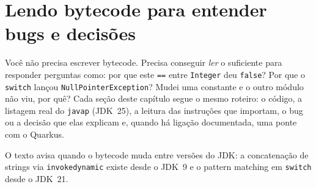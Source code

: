 \chapter{Lendo bytecode para entender bugs e decisões}
\label{cap:lendo-bytecode}

\proximasaulas

Você não precisa escrever bytecode. Precisa conseguir \emph{ler} o
suficiente para responder perguntas como: por que este \texttt{==} entre
\texttt{Integer} deu \texttt{false}? Por que o \texttt{switch} lançou
\texttt{NullPointerException}? Mudei uma constante e o outro módulo não
viu, por quê? Cada seção deste capítulo segue o mesmo roteiro: o código,
a listagem real do \texttt{javap} (JDK~25), a leitura das instruções que
importam, o bug ou a decisão que elas explicam e, quando há ligação
documentada, uma ponte com o Quarkus.

O texto avisa quando o bytecode muda entre versões do JDK: a
concatenação de strings via \texttt{invokedynamic} existe desde o JDK~9
e o pattern matching em \texttt{switch} desde o JDK~21.











